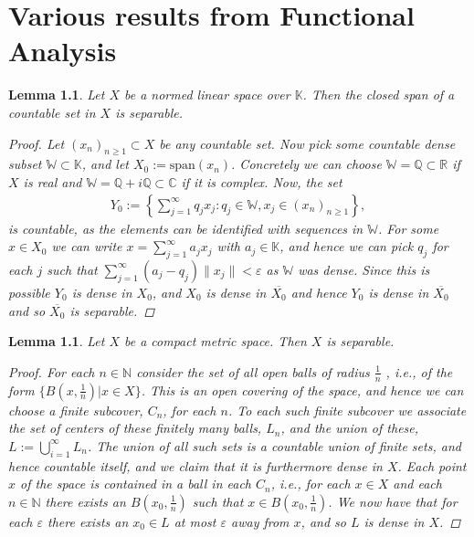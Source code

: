 \documentclass[10pt,twoside,openany,final]{memoir}
\theoremstyle{break}
\newtheorem{lemma}[section]{Lemma}
\theoremstyle{Break}
\newcommand{\lv}{\lVert}
\newcommand{\rv}{\rVert}
\newcommand{\N}{\mathbb{N}}
\begin{document}
\chapter{Various results from Functional Analysis}
\begin{lemma}\label{lma:span separable}
Let $X$ be a normed linear space over $\mathbb{K}$. Then the closed span of a countable set in $X$ is separable. 
\begin{proof}
Let $(x_{n})_{n\geq1}\subset X$ be any countable set. Now pick some countable dense subset $\mathbb{W} \subset \mathbb{K}$, and let $X_{0}:={\text{span}}(x_{n})$. Concretely we can choose $\mathbb{W} = \mathbb{Q} \subset \mathbb{R}$ if $X$ is real and $\mathbb{W} = \mathbb{Q} + i\mathbb{Q}\subset \mathbb{C}$ if it is complex. Now, the set 
\begin{align*}
Y_{0}:=\left\{ \sum_{j=1}^\infty q_{j} x_{j} :  q_{j} \in \mathbb{W}, x_{j} \in (x_{n})_{n\geq 1} \right\},
\end{align*}
is countable, as the elements can be identified with sequences in $\mathbb{W}$.
For some $x\in X_0$ we can write $x= \sum_{j=1}^\infty a_{j} x_{j}$ with $a_j\in \mathbb{K}$, and hence we can pick $q_j$ for each $j$ such that $\sum_{j=1}^\infty (a_{j} - q_{j})\lv x_{j} \rv < \varepsilon$ as $\mathbb{W}$ was dense.
Since this is possible $Y_0$ is dense in $X_0$, and $X_{0}$ is dense in $\overline{X_{0}}$ and hence $Y_{0}$ is dense in  $\overline{X_0}$ and so $\overline{X_0}$ is separable.

\end{proof}
\end{lemma}
\begin{lemma}\label{lma: compact metric implies sep}
Let $X$ be a compact metric space. Then $X$ is separable.
\begin{proof}
    For each $n\in \N$ consider the set of all open balls of radius $\frac{1}{n}$ , i.e., of the form $\{B(x,\frac{1}{n})|x\in X\}$.
    This is an open covering of the space, and hence we can choose a finite subcover, $C_n$, for each $n$.
    To each such finite subcover we associate the set of centers of these finitely many balls, $L_n$, and the union of these, $L:=\bigcup^\infty_{i=1}L_n$.
    The union of all such sets is a countable union of finite sets, and hence countable itself, and we claim that it is furthermore dense in $X$.
    Each point $x$ of the space is contained in a ball in each $C_n$, i.e., for each $x \in X$ and each $n \in \N$ there exists an $B(x_0,\frac{1}{n})$ such that $x\in B(x_0, \frac{1}{n})$.
    We now have that for each $\varepsilon$ there exists an $x_0\in L$ at most $\varepsilon$ away from $x$, and so $L$ is dense in $X$.
\end{proof}
\end{lemma}
\end{document}

